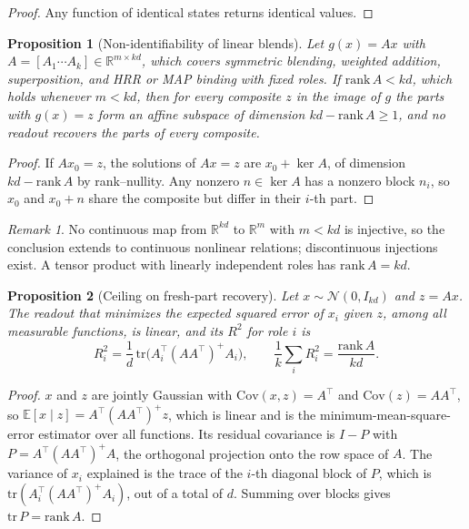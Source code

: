\documentclass[10pt]{article}
\theoremstyle{plain}
\newtheorem{proposition}{Proposition}
\theoremstyle{remark}
\newtheorem*{remark}{Remark}
\newcommand{\R}{\mathbb{R}}
\begin{document}
\begin{proof}
Any function of identical states returns identical values.
\end{proof}

\begin{proposition}[Non-identifiability of linear blends]
\label{prop:fiber}
Let $g(x) = Ax$ with $A = [A_1 \cdots A_k] \in \R^{m \times kd}$, which covers symmetric blending, weighted addition, superposition, and HRR or MAP binding with fixed roles. If $\mathrm{rank}\,A < kd$, which holds whenever $m < kd$, then for every composite $z$ in the image of $g$ the parts with $g(x) = z$ form an affine subspace of dimension $kd - \mathrm{rank}\,A \geq 1$, and no readout recovers the parts of every composite.
\end{proposition}

\begin{proof}
If $Ax_0 = z$, the solutions of $Ax = z$ are $x_0 + \ker A$, of dimension $kd - \mathrm{rank}\,A$ by rank--nullity. Any nonzero $n \in \ker A$ has a nonzero block $n_i$, so $x_0$ and $x_0 + n$ share the composite but differ in their $i$-th part.
\end{proof}

\begin{remark}
No continuous map from $\R^{kd}$ to $\R^m$ with $m < kd$ is injective, so the conclusion extends to continuous nonlinear relations; discontinuous injections exist. A tensor product with linearly independent roles has $\mathrm{rank}\,A = kd$.
\end{remark}

\begin{proposition}[Ceiling on fresh-part recovery]
\label{prop:ceiling}
Let $x \sim \mathcal{N}(0, I_{kd})$ and $z = Ax$. The readout that minimizes the expected squared error of $x_i$ given $z$, among all measurable functions, is linear, and its $R^2$ for role $i$ is
\begin{equation}
  R^2_i = \frac{1}{d}\,\mathrm{tr}\big(A_i^{\top} (A A^{\top})^{+} A_i\big), \qquad \frac{1}{k}\sum_i R^2_i = \frac{\mathrm{rank}\,A}{kd}.
\end{equation}
\end{proposition}

\begin{proof}
$x$ and $z$ are jointly Gaussian with $\mathrm{Cov}(x, z) = A^{\top}$ and $\mathrm{Cov}(z) = AA^{\top}$, so $\mathbb{E}[x \mid z] = A^{\top}(AA^{\top})^{+}z$, which is linear and is the minimum-mean-square-error estimator over all functions. Its residual covariance is $I - P$ with $P = A^{\top}(AA^{\top})^{+}A$, the orthogonal projection onto the row space of $A$. The variance of $x_i$ explained is the trace of the $i$-th diagonal block of $P$, which is $\mathrm{tr}(A_i^{\top}(AA^{\top})^{+}A_i)$, out of a total of $d$. Summing over blocks gives $\mathrm{tr}\,P = \mathrm{rank}\,A$.
\end{proof}
\end{document}
